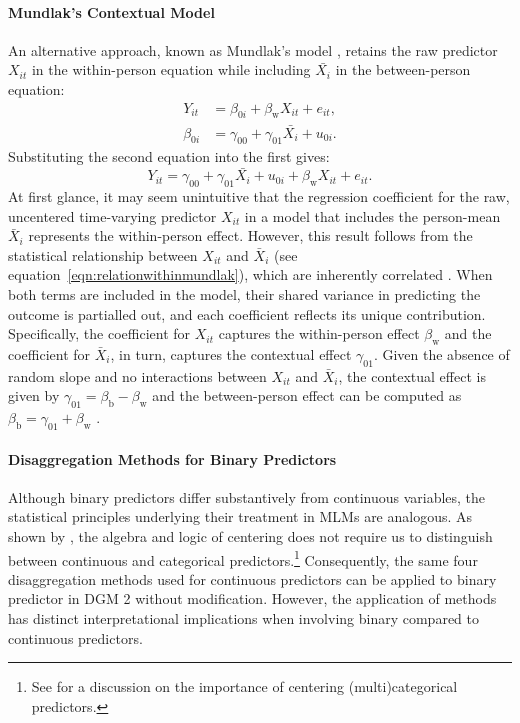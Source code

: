 \paragraph{Mundlak's Contextual Model}

An alternative approach, known as Mundlak's model \parencite{mundlak_pooling_1978}, retains the raw predictor $X_{it}$ in the within-person equation while including $\bar{X_i}$ in the between-person equation:
\begin{align}
Y_{it} &= \beta_{0i} + \beta_\text{w} X_{it} + e_{it}, \\
\beta_{0i} &= \gamma_{00} + \gamma_{01} \bar{X_i} + u_{0i}.
\end{align}
Substituting the second equation into the first gives:
\begin{equation}
\label{eqn:method-M3-linear}
Y_{it} = \gamma_{00} + \gamma_{01} \bar{X_i} + u_{0i} + \beta_\text{w} X_{it} + e_{it}.
\end{equation}
At first glance, it may seem unintuitive that the regression coefficient for the raw, uncentered time-varying predictor \( X_{it} \) in a model that includes the person-mean \( \bar{X}_i \) represents the within-person effect. However, this result follows from the statistical relationship between \( X_{it} \) and \( \bar{X}_i \) (see equation~\ref{eqn:relationwithinmundlak}), which are inherently correlated \parencite[cf.][]{hoffman_longitudinal_2015}. When both terms are included in the model, their shared variance in predicting the outcome is partialled out, and each coefficient reflects its unique contribution. Specifically, the coefficient for \( X_{it} \) captures the within-person effect \( \beta_\text{w} \) and the coefficient for \( \bar{X}_i \), in turn, captures the contextual effect \( \gamma_{01} \). Given the absence of random slope and no interactions between  \( X_{it} \) and \( \bar{X}_i \), the contextual effect is given by \( \gamma_{01} = \beta_\text{b} - \beta_\text{w} \) and the between-person effect can be computed as  \(   \beta_\text{b} = \gamma_{01} +  \beta_\text{w}\) \parencite{raudenbush_hierarchical_2002}.

\paragraph{Disaggregation Methods for Binary Predictors}

Although binary predictors differ substantively from continuous variables, the statistical principles underlying their treatment in MLMs are analogous. As shown by \textcite{enders_centering_2007}, the algebra and logic of centering does not require us to distinguish between continuous and categorical predictors.\footnote{See \textcite{yaremych_centering_2023} for a discussion on the importance of centering (multi)categorical predictors.} Consequently, the same four disaggregation methods used for continuous predictors can be applied to binary predictor in DGM 2 without modification. However, the application of methods has distinct interpretational implications when involving binary compared to continuous predictors.


